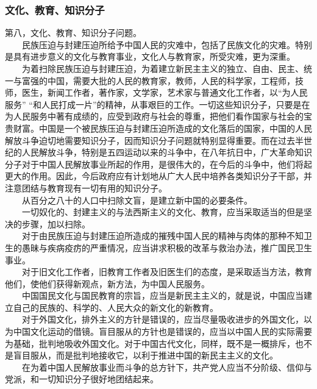 \documentclass[cn,11pt,chinese]{elegantbook}
\def\myformat#1{\hfil\hfil #1}
\begin{document}
\subsubsection*{\myformat{文化、教育、知识分子}}
第八，文化、教育、知识分子问题。\\
　　民族压迫与封建压迫所给予中国人民的灾难中，包括了民族文化的灾难。特别是具有进步意义的文化与教育事业，文化人与教育家，所受灾难，更为深重。\\
　　为着扫除民族压迫与封建压迫，为着建立新民主主义的独立、自由、民主、统一与富强的中国，需要大批的人民的教育家，教师，人民的科学家，工程师，技师，医生，新闻工作者，著作家，文学家，艺术家与普通文化工作者，以“为人民服务” “和人民打成一片”的精神，从事艰巨的工作。一切这些知识分子，只要是在为人民服务中著有成绩的，应受到政府与社会的尊重，把他们看作国家与社会的宝贵财富。中国是一个被民族压迫与封建压迫所造成的文化落后的国家，中国的人民解放斗争迫切地需要知识分子，因而知识分子问题就特别显得重要。而在过去半世纪的人民解放斗争，特别是五四运动以来的斗争中，在八年抗日中，广大革命知识分子对于中国人民解放事业所起的作用，是很伟大的，在今后的斗争中，他们将起更大的作用。因此，今后政府应有计划地从广大人民中培养各类知识分子干部，并注意团结与教育现有一切有用的知识分子。\\
　　从百分之八十的人口中扫除文盲，是建立新中国的必要条件。\\
　　一切奴化的、封建主义的与法西斯主义的文化、教育，应当采取适当的但是坚决的步骤，加以扫除。\\
　　对于由民族压迫与封建压迫所造成的摧残中国人民的精神与肉体的那种不知卫生的愚昧与疾病疫疠的严重情况，应当讲求积极的改革与救治办法，推广国民卫生事业。\\
　　对于旧文化工作者，旧教育工作者及旧医生们的态度，是采取适当方法，教育他们，使他们获得新观点，新方法，为中国人民服务。\\
　　中国国民文化与国民教育的宗旨，应当是新民主主义的，就是说，中国应当建立自己的民族的、科学的、人民大众的新文化的新教育。\\
　　对于外国文化，排外主义的方针是错误的，应当尽量吸收进步的外国文化，以为中国文化运动的借镜。盲目服从的方针也是错误的，应当以中国人民的实际需要为基础，批判地吸收外国文化。对于中国古代文化，同样，既不是一概排斥，也不是盲目服从，而是批判地接收它，以利于推进中国的新民主主义的文化。\\
　　在为着中国人民解放事业而斗争的总方针下，共产党人应当不分阶级、信仰与党派，和一切知识分子很好地团结起来。\\
\end{document}
